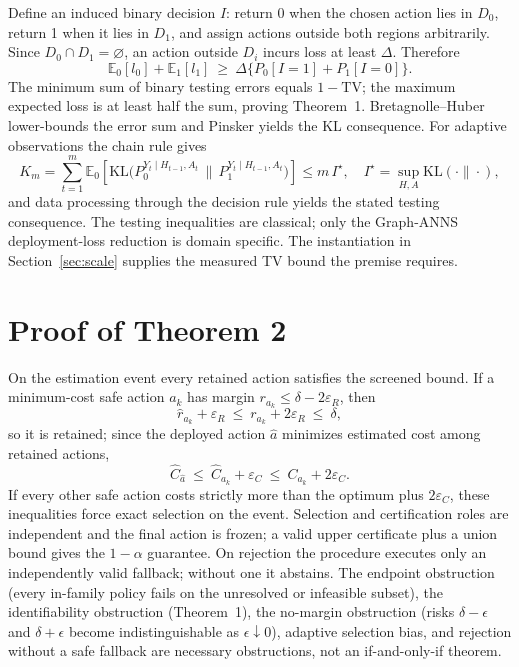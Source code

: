 \documentclass{article}
\newcommand{\TV}{\mathrm{TV}}
\newcommand{\KL}{\mathrm{KL}}
\newcommand{\E}{\mathbb{E}}
\begin{document}
Define an induced binary decision $I$: return 0 when the chosen action lies in $D_0$, return 1 when it lies
in $D_1$, and assign actions outside both regions arbitrarily. Since $D_0\cap D_1=\varnothing$, an action
outside $D_i$ incurs loss at least $\Delta$. Therefore
\begin{equation}
\E_{0}[l_{0}]+\E_{1}[l_{1}]\ \ge\ \Delta\bigl\{P_{0}[I{=}1]+P_{1}[I{=}0]\bigr\}.
\label{eq:proof1}
\end{equation}
The minimum sum of binary testing errors equals $1-\TV$; the maximum expected loss is at least half the sum,
proving Theorem~1. Bretagnolle--Huber lower-bounds the error sum and Pinsker yields the KL consequence.
For adaptive observations the chain rule gives
\begin{equation}
K_{m}=\sum_{t=1}^{m}\E_{0}\!\left[\KL\bigl(P_{0}^{Y_{t}\mid H_{t-1},A_{t}}\,\bigl\|\,P_{1}^{Y_{t}\mid H_{t-1},A_{t}}\bigr)\right]\le m\,I^{\star},\quad I^{\star}=\textstyle\sup_{H,A}\mathrm{KL}(\cdot\|\cdot),
\label{eq:chain}
\end{equation}
and data processing through the decision rule yields the stated testing consequence. The testing
inequalities are classical; only the Graph-ANNS deployment-loss reduction is domain specific. The
instantiation in Section~\ref{sec:scale} supplies the measured TV bound the premise requires.

\section{Proof of Theorem 2}
\label{app:proof2}

On the estimation event every retained action satisfies the screened bound. If a minimum-cost safe action
$a_k$ has margin $r_{a_k}\le\delta-2\varepsilon_R$, then
\begin{equation}
\hat r_{a_{k}}+\varepsilon_{R}\ \le\ r_{a_{k}}+2\varepsilon_{R}\ \le\ \delta,
\label{eq:retain}
\end{equation}
so it is retained; since the deployed action $\hat a$ minimizes estimated cost among retained actions,
\begin{equation}
\hat C_{\hat a}\ \le\ \hat C_{a_{k}}+\varepsilon_{C}\ \le\ C_{a_{k}}+2\varepsilon_{C}.
\label{eq:cost}
\end{equation}
If every other safe action costs strictly more than the optimum plus $2\varepsilon_C$, these inequalities
force exact selection on the event. Selection and certification roles are independent and the final action
is frozen; a valid upper certificate plus a union bound gives the $1-\alpha$ guarantee. On rejection the
procedure executes only an independently valid fallback; without one it abstains. The endpoint obstruction
(every in-family policy fails on the unresolved or infeasible subset), the identifiability obstruction
(Theorem~1), the no-margin obstruction (risks $\delta-\epsilon$ and $\delta+\epsilon$ become
indistinguishable as $\epsilon\downarrow0$), adaptive selection bias, and rejection without a safe fallback
are necessary obstructions, not an if-and-only-if theorem.
\end{document}
